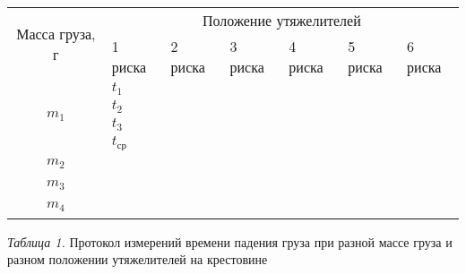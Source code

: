 \begin{center}
    \begin{tabular}{|c|p{1.8cm}|p{1.8cm}|p{1.8cm}|p{1.8cm}|p{1.8cm}|p{1.8cm}|}
        \hline
        \multirow{2}{*}{Масса груза, г} & \multicolumn{6}{c|}{Положение утяжелителей} \\
        \cline{2-7}
        & 1 риска       & 2 риска & 3 риска & 4 риска & 5 риска & 6 риска \\
        \hline
        \multirow{4}{*}{$m_1$} & $t_1$         &         &         &         &         &         \\
        \cline{2-7}
        & $t_2$         &         &         &         &         &         \\
        \cline{2-7}
        & $t_3$         &         &         &         &         &         \\
        \cline{2-7}
        & $t_\text{ср}$ &         &         &         &         &         \\
        \hline
        \multirow{4}{*}{$m_2$} &               &         &         &         &         &         \\
        \cline{2-7}
        &               &         &         &         &         &         \\
        \cline{2-7}
        &               &         &         &         &         &         \\
        \cline{2-7}
        &               &         &         &         &         &         \\
        \hline
        \multirow{4}{*}{$m_3$} &               &         &         &         &         &         \\
        \cline{2-7}
        &               &         &         &         &         &         \\
        \cline{2-7}
        &               &         &         &         &         &         \\
        \cline{2-7}
        &               &         &         &         &         &         \\
        \hline
        \multirow{4}{*}{$m_4$} &               &         &         &         &         &         \\
        \cline{2-7}
        &               &         &         &         &         &         \\
        \cline{2-7}
        &               &         &         &         &         &         \\
        \cline{2-7}
        &               &         &         &         &         &         \\
        \hline

    \end{tabular}

    \smallvspace

    \textit{Таблица 1.} Протокол измерений времени падения груза при разной
    массе груза и разном положении утяжелителей на крестовине
\end{center}